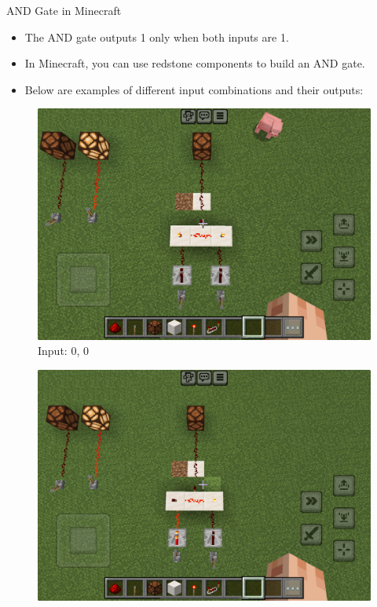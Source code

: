 \documentclass{beamer}
\begin{document}
\begin{frame}{AND Gate in Minecraft}
    \begin{itemize}
        \item The AND gate outputs 1 only when both inputs are 1.
        \item In Minecraft, you can use redstone components to build an AND gate.
        \item Below are examples of different input combinations and their outputs:
    \end{itemize}
    \begin{figure}[ht]
        \centering
        \begin{minipage}{0.32\textwidth}
            \centering
            \includegraphics[width=\textwidth]{images/andgate_00.png}\\
            \small Input: 0, 0
        \end{minipage}
        \begin{minipage}{0.32\textwidth}
            \centering
            \includegraphics[width=\textwidth]{images/andgate_01.png}\\

\end{minipage}
\end{figure}
\end{frame}
\end{document}
